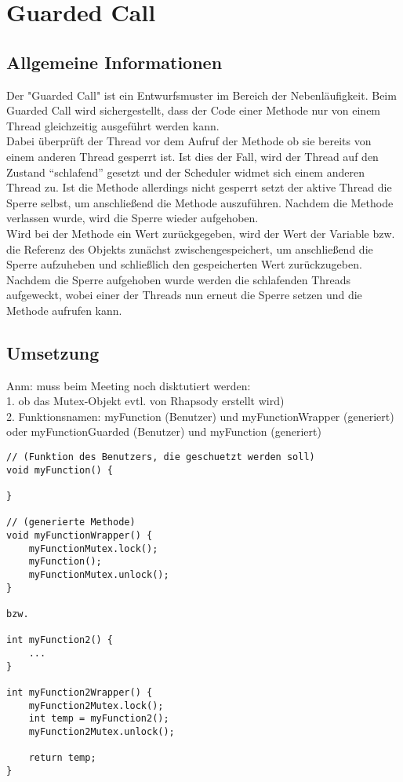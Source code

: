 \chapter{Guarded Call}

\section{Allgemeine Informationen}
Der "Guarded Call" ist ein Entwurfsmuster im Bereich der Nebenläufigkeit. Beim Guarded Call wird sichergestellt, dass der Code einer Methode nur von einem Thread gleichzeitig ausgeführt werden kann.\\
Dabei überprüft der Thread vor dem Aufruf der Methode ob sie bereits von einem anderen Thread gesperrt ist. Ist dies der Fall, wird der Thread auf den Zustand \enquote{schlafend} gesetzt und der Scheduler widmet sich einem anderen Thread zu. Ist die Methode allerdings nicht gesperrt setzt der aktive Thread die Sperre selbst, um anschließend die Methode auszuführen. Nachdem die Methode verlassen wurde, wird die Sperre wieder aufgehoben.\\
Wird bei der Methode ein Wert zurückgegeben, wird der Wert der Variable bzw. die Referenz des Objekts zunächst zwischengespeichert, um anschließend die Sperre aufzuheben und schließlich den gespeicherten Wert zurückzugeben.\\
Nachdem die Sperre aufgehoben wurde werden die schlafenden Threads aufgeweckt, wobei einer der Threads nun erneut die Sperre setzen und die Methode aufrufen kann.

\section{Umsetzung}
Anm: muss beim Meeting noch disktutiert werden:\\
1. ob das Mutex-Objekt evtl. von Rhapsody erstellt wird)\\
2. Funktionsnamen: myFunction (Benutzer) und myFunctionWrapper (generiert) oder myFunctionGuarded (Benutzer) und myFunction (generiert)\\

 \begin{lstlisting}
// (Funktion des Benutzers, die geschuetzt werden soll)
void myFunction() {

}

// (generierte Methode)
void myFunctionWrapper() {
	myFunctionMutex.lock();
	myFunction();
	myFunctionMutex.unlock();
}

bzw.

int myFunction2() {
	...
}

int myFunction2Wrapper() {
	myFunction2Mutex.lock();
	int temp = myFunction2();
	myFunction2Mutex.unlock();

	return temp;
}

\end{lstlisting}
